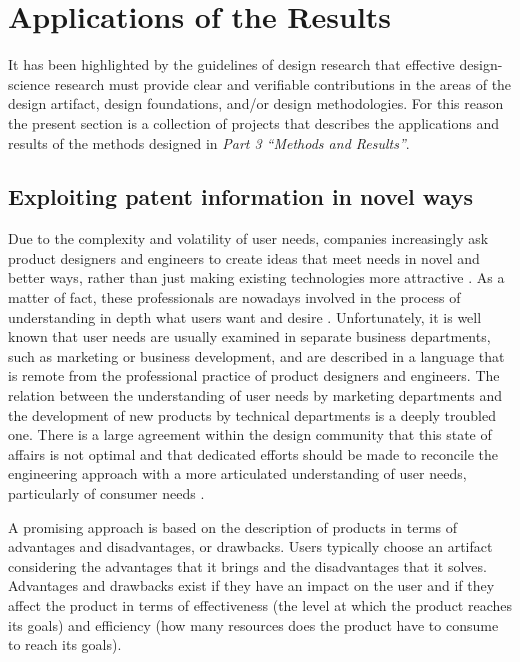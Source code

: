 \documentclass[]{book}
\begin{document}
\part{Applications of the
Results}\label{part-applications-of-the-results}

It has been highlighted by the guidelines of design research
\citep{bichler2006design} that effective design-science research must
provide clear and verifiable contributions in the areas of the design
artifact, design foundations, and/or design methodologies. For this
reason the present section is a collection of projects that describes
the applications and results of the methods designed in \emph{Part 3
``Methods and Results''}.

\chapter{Exploiting patent information in novel
ways}\label{exploiting-patent-information-in-novel-ways}

Due to the complexity and volatility of user needs, companies
increasingly ask product designers and engineers to create ideas that
meet needs in novel and better ways, rather than just making existing
technologies more attractive \citep{brown2010design}. As a matter of
fact, these professionals are nowadays involved in the process of
understanding in depth what users want and desire
\citep{haley1968benefit, day1979customer}. Unfortunately, it is well
known that user needs are usually examined in separate business
departments, such as marketing or business development, and are
described in a language that is remote from the professional practice of
product designers and engineers. The relation between the understanding
of user needs by marketing departments and the development of new
products by technical departments is a deeply troubled one. There is a
large agreement within the design community that this state of affairs
is not optimal and that dedicated efforts should be made to reconcile
the engineering approach with a more articulated understanding of user
needs, particularly of consumer needs
\citep{pahl2013engineering, eppinger1995product}.

A promising approach is based on the description of products in terms of
advantages and disadvantages, or drawbacks. Users typically choose an
artifact considering the advantages that it brings and the disadvantages
that it solves. Advantages and drawbacks exist if they have an impact on
the user and if they affect the product in terms of effectiveness (the
level at which the product reaches its goals) and efficiency (how many
resources does the product have to consume to reach its goals).
\end{document}
